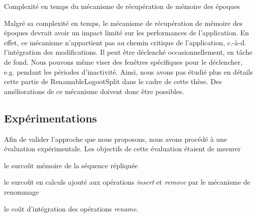 \documentclass[12pt]{thesul}
\newcommand{\eg}{e.g. }
\newcommand{\ie}{c.-à-d. }
\begin{document}
\begin{table}[!ht]
  \centering
  \caption{Complexité en temps du mécanisme de récupération de mémoire des époques}
  \label{tab:time-complexity-gc-mechanism-epochs}
  \caption*{$n$: nombre de noeuds du système, $e$: nombre d'époques dans l'\emph{arbre des époques}, $h$: hauteur de l'\emph{arbre des époques}}
\end{table}

Malgré sa complexité en temps, le mécanisme de récupération de mémoire des époques devrait avoir un impact limité sur les performances de l'application.
En effet, ce mécanisme n'appartient pas au chemin critique de l'application, \ie l'intégration des modifications.
Il peut être déclenché occasionnellement, en tâche de fond.
Nous pouvons même viser des fenêtres spécifiques pour le déclencher, \eg pendant les périodes d'inactivité.
Ainsi, nous avons pas étudié plus en détails cette partie de RenamableLogootSplit dans le cadre de cette thèse.
Des améliorations de ce mécanisme doivent donc être possibles.

\subsection{Expérimentations}

Afin de valider l'approche que nous proposons, nous avons procédé à une évaluation expérimentale.
Les objectifs de cette évaluation étaient de mesurer
\begin{enumerate*}[label=(\roman*)]
  \item le surcoût mémoire de la séquence répliquée
  \item le surcoût en calculs ajouté aux opérations \emph{insert} et \emph{remove} par le mécanisme de renommage
  \item le coût d'intégration des opérations \emph{rename}.
\end{enumerate*}
\end{document}
